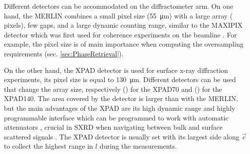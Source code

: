 Different detectors can be accommodated on the diffractometer arm.
On one hand, the MERLIN \parencite{Bewley2006} combines a small pixel size (\qty{55}{\um}) with a large array ( pixels), few gaps, and a large dynamic counting range, similar to the MAXIPIX detector \parencite{Ponchut2011} which was first used for coherence experiments on the beamline \parencite{Schavkan2013, Li2020}.
For example, the pixel size is of main importance when computing the oversampling requirements (sec. \ref{sec:PhaseRetrieval}).

On the other hand, the XPAD detector \parencite{Basolo2005, Dawiec2016} is used for surface x-ray diffraction experiments, its pixel size is equal to \qty{130}{\um}.
Different detectors can be used that change the array size, respectively () for the XPAD70 and () for the XPAD140.
The area covered by the detector is larger than with the MERLIN, but the main advantages of the XPAD are its high dynamic range and highly programmable interface \parencite{Fertey2013} which can be programmed to work with automatic attenuators \parencite{Dawiec2016}, crucial in SXRD when navigating between bulk and surface scattered signals .
The XPAD detector is usually set with its largest side along $\vec{c}$ to collect the highest range in $l$ during the measurements.